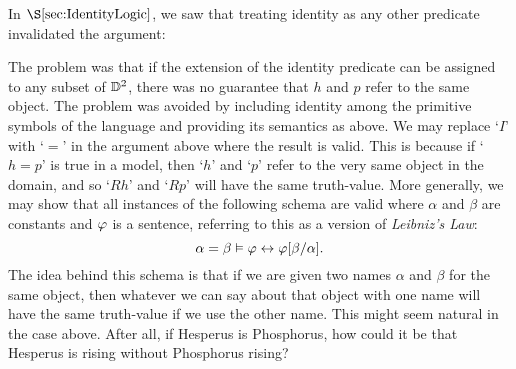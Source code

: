 In $\S\ref{sec:IdentityLogic}$, we saw that treating identity as any other predicate invalidated the argument:
\begin{multicols}{2}
  \begin{oarg}[\ref{informHP}] 
  \end{oarg}

  \columnbreak

  \begin{oarg}[\ref{formHP}] 
  \end{oarg}
\end{multicols}
The problem was that if the extension of the identity predicate can be assigned to any subset of $\mathbb{D}^2$, there was no guarantee that $h$ and $p$ refer to the same object.
The problem was avoided by including identity among the primitive symbols of the language and providing its semantics as above.
We may replace `$I$' with `$=$' in the argument above where the result is valid.
This is because if `$h=p$' is true in a model, then `$h$' and `$p$' refer to the very same object in the domain, and so `$Rh$' and `$Rp$' will have the same truth-value.
More generally, we may show that all instances of the following schema are valid where $\alpha$ and $\beta$ are constants and $\varphi$ is a sentence, referring to this as a version of \textit{Leibniz's Law}:
  $$\alpha=\beta \vDash \varphi \leftrightarrow \varphi[\beta/\alpha].$$
The idea behind this schema is that if we are given two names $\alpha$ and $\beta$ for the same object, then whatever we can say about that object with one name will have the same truth-value if we use the other name.
This might seem natural in the case above.
After all, if Hesperus is Phosphorus, how could it be that Hesperus is rising without Phosphorus rising?

